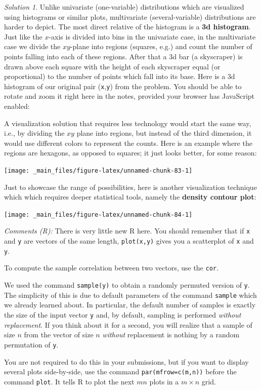 \documentclass[
]{book}
\theoremstyle{definition}
\theoremstyle{definition}
\theoremstyle{definition}
\theoremstyle{definition}
\theoremstyle{remark}
\newtheorem*{solution}{Solution}
\begin{document}
\begin{solution}
Unlike univariate (one-variable) distributions which are visualized using
histograms or similar plots, multivariate (several-variable) distributions are
harder to depict. The most direct relative of the histogram is a \textbf{3d
histogram}. Just like the \(x\)-axis is divided into bins in the univariate case,
in the multivariate case we divide the \(xy\)-plane into regions (squares, e.g.)
and count the number of points falling into each of these regions. After that
a 3d bar (a skyscraper) is drawn above each square with the height of each
skyscraper equal (or proportional) to the number of points which fall into its
base. Here is a 3d histogram of our original pair (\texttt{x},\texttt{y}) from the problem.
You should be able to rotate and zoom it right here in the notes, provided your
browser has JavaScript enabled:

A visualization solution that requires less technology would start the same way,
i.e., by dividing the \(xy\) plane into regions, but instead of the third
dimension, it would use different colors to represent the counts. Here is an
example where the regions are hexagons, as opposed to squares; it just looks
better, for some reason:

\begin{center}\texttt{[image: \_main\_files/figure-latex/unnamed-chunk-83-1]} \end{center}

Just to showcase the range of possibilities, here is another visualization
technique which which requires deeper statistical tools, namely the
\textbf{density contour plot}:

\begin{center}\texttt{[image: \_main\_files/figure-latex/unnamed-chunk-84-1]} \end{center}

\emph{Comments (R):} There is very little new R here. You should remember that if \texttt{x} and \texttt{y} are
vectors of the same length, \texttt{plot(x,y)} gives you a scatterplot of \texttt{x} and \texttt{y}.

To compute the sample correlation between two vectors, use the \texttt{cor}.

We used the command \texttt{sample(y)} to obtain a randomly permuted version of \texttt{y}.
The simplicity of this is due to default parameters of the command \texttt{sample}
which we already learned about. In particular, the default number of samples is
exactly the size of the input vector \texttt{y} and, by default, sampling is performed
\emph{without replacement}. If you think about it for a second, you will realize that
a sample of size \(n\) from the vector of size \(n\) \emph{without} replacement is
nothing by a random permutation of \texttt{y}.

You are not required to do this in your submissions, but if you want to display
several plots side-by-side, use the command \texttt{par(mfrow=c(m,n))} before the command
\texttt{plot}. It tells R to plot the next \(mn\) plots in a \(m\times n\) grid.
\end{solution}
\end{document}
